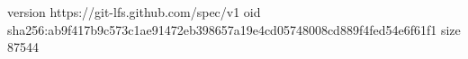 version https://git-lfs.github.com/spec/v1
oid sha256:ab9f417b9c573c1ae91472eb398657a19e4cd05748008cd889f4fed54e6f61f1
size 87544
